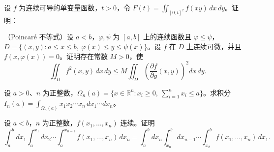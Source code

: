 \noindent\begin{minipage}{\textwidth}
设 $f$ 为连续可导的单变量函数，$t>0$，令 $\displaystyle F(t)=\iint_{[0,t]^2}f(xy)\,dx\,dy$。证明：
\end{minipage}\par\vfill
\noindent\begin{minipage}{\textwidth}
（Poincaré 不等式）设 $a<b$，$\varphi,\psi$ 为 $[a,b]$ 上的连续函数且 $\varphi\le\psi$，$D=\{(x,y):a\le x\le b,\ \varphi(x)\le y\le\psi(x)\}$。设 $f$ 在 $D$ 上连续可微，并且 $f(x,\varphi(x))=0$。证明存在常数 $M>0$，使\[\iint_Df^2(x,y)\,dx\,dy\le M\iint_D\left(\frac{\partial f}{\partial y}(x,y)\right)^2dx\,dy.\]
\end{minipage}\par\vfill
\noindent\begin{minipage}{\textwidth}
设 $a>0$、$n$ 为正整数，$\Omega_n(a)=\{x\in\mathbb R^n:x_i\ge0,\ \sum_{i=1}^nx_i\le a\}$。求积分 $\displaystyle I_n(a)=\int_{\Omega_n(a)}x_1x_2\cdots x_n\,dx_1\cdots dx_n$。
\end{minipage}\par\vfill
\newpage
\noindent\begin{minipage}{\textwidth}
设 $a<b$，$n$ 为正整数，$f(x_1,\ldots,x_n)$ 连续。证明\[\int_a^bdx_1\int_a^{x_1}dx_2\cdots\int_a^{x_{n-1}}f(x_1,\ldots,x_n)\,dx_n=\int_a^bdx_n\int_{x_n}^bdx_{n-1}\cdots\int_{x_2}^bf(x_1,\ldots,x_n)\,dx_1.\]
\end{minipage}\par\vfill
